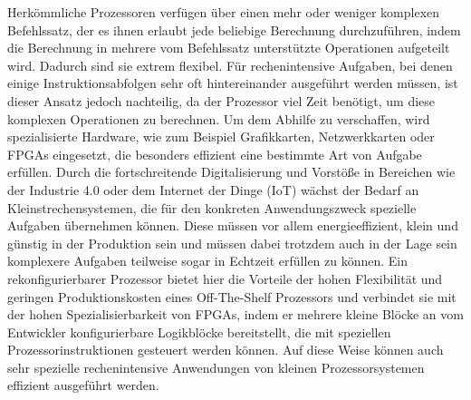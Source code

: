 Herkömmliche Prozessoren verfügen über einen mehr oder weniger komplexen Befehlssatz, der es ihnen erlaubt jede beliebige Berechnung durchzuführen,
indem die Berechnung in mehrere vom Befehlssatz unterstützte Operationen aufgeteilt wird. Dadurch sind sie extrem flexibel.
Für rechenintensive Aufgaben, bei denen einige Instruktionsabfolgen sehr oft hintereinander ausgeführt werden müssen, ist dieser Ansatz jedoch nachteilig,
da der Prozessor viel Zeit benötigt, um diese komplexen Operationen zu berechnen. Um dem Abhilfe zu verschaffen, wird spezialisierte Hardware,
wie zum Beispiel Grafikkarten, Netzwerkkarten oder FPGAs eingesetzt, die besonders effizient eine bestimmte Art von Aufgabe erfüllen.
Durch die fortschreitende Digitalisierung und Vorstöße in Bereichen wie der Industrie 4.0 oder dem Internet der Dinge (IoT) wächst der Bedarf an Kleinstrechensystemen,
die für den konkreten Anwendungszweck spezielle Aufgaben übernehmen können. Diese müssen vor allem energieeffizient, klein und günstig in der Produktion sein
und müssen dabei trotzdem auch in der Lage sein komplexere Aufgaben teilweise sogar in Echtzeit erfüllen zu können.
Ein rekonfigurierbarer Prozessor bietet hier die Vorteile der hohen Flexibilität und geringen Produktionskosten eines Off-The-Shelf Prozessors
und verbindet sie mit der hohen Spezialisierbarkeit von FPGAs, indem er mehrere kleine Blöcke an vom Entwickler konfigurierbare Logikblöcke bereitstellt,
die mit speziellen Prozessorinstruktionen gesteuert werden können. Auf diese Weise können auch sehr spezielle rechenintensive Anwendungen von kleinen Prozessorsystemen
effizient ausgeführt werden.


